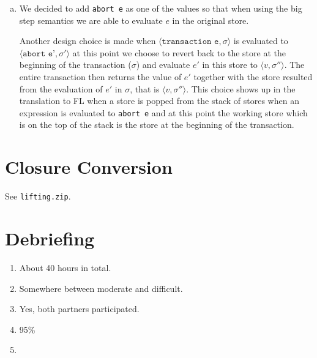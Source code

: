 \documentclass[10pt]{article}
\begin{document}
\begin{enumerate} [(a)]
\begin{align*}
    \llbracket e_1~e_2 \rrbracket~\rho_{dyn}~\overline{\sigma_{dyn}} \triangleq&~ \texttt{let } (f, \overline{\sigma_1}) = \llbracket e_1 \rrbracket ~ \rho_{dyn} ~ \overline{\sigma_{dyn}} \texttt{ in}\\
    &~\texttt{let } (v, \overline{\sigma_2}) = \llbracket e_2 \rrbracket ~ \rho_{dyn} ~ \overline{\sigma_1} \texttt{ in } f ~ v ~ \overline{\sigma_2}\\
    \llbracket \texttt{transaction e}\rrbracket~\rho~\overline{\sigma} \triangleq&~\llbracket e\rrbracket~\rho~(\#1~\overline{\sigma}, \overline{\sigma})\\
    \llbracket \texttt{abort e}\rrbracket~\rho~\overline{\sigma} \triangleq&~\llbracket e\rrbracket~\rho~(\#2 \overline{\sigma})
    \end{align*}
    The idea is that when evaluating \texttt{transaction e} we will push the current store onto the top of the list and continue evaluating $e$ in the current store. For \texttt{abort e} we will remove the first store in the list and $e$ will be evaluated in the next store since this is the store of the latest transaction.
    \item We decided to add \texttt{abort e} as one of the values so that when using the big step semantics we are able to evaluate $e$ in the original store.

    Another design choice is made when $\langle \texttt{transaction e}, \sigma \rangle$ is evaluated to $\langle \texttt{abort e'}, \sigma' \rangle$ at this point we choose to revert back to the store at the beginning of the transaction ($\sigma$) and evaluate $e'$ in this store to $\langle v, \sigma'' \rangle$. The entire transaction then returns the value of $e'$ together with the store resulted from the evaluation of $e'$ in $\sigma$, that is $\langle v, \sigma'' \rangle$. This choice shows up in the translation to FL when a store is popped from the stack of stores when an expression is evaluated to \texttt{abort e} and at this point the working store which is on the top of the stack is the store at the beginning of the transaction.
    \end{enumerate}
\section{Closure Conversion}%
See \texttt{lifting.zip}.
\section{Debriefing}%
\begin{enumerate}
    \item About 40 hours in total.
    \item Somewhere between moderate and difficult.
    \item Yes, both partners participated.
    \item 95\%
    \item
\end{enumerate}
\end{document}
